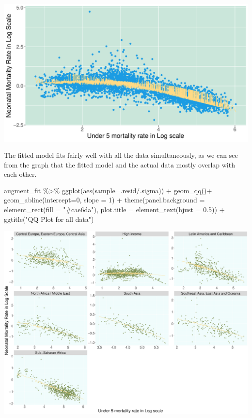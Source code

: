 \documentclass[
]{article}
\newenvironment{Shaded}{\begin{snugshade}}{\end{snugshade}}
\newcommand{\AttributeTok}[1]{\textcolor[rgb]{0.77,0.63,0.00}{#1}}
\newcommand{\DecValTok}[1]{\textcolor[rgb]{0.00,0.00,0.81}{#1}}
\newcommand{\FloatTok}[1]{\textcolor[rgb]{0.00,0.00,0.81}{#1}}
\newcommand{\FunctionTok}[1]{\textcolor[rgb]{0.00,0.00,0.00}{#1}}
\newcommand{\NormalTok}[1]{#1}
\newcommand{\SpecialCharTok}[1]{\textcolor[rgb]{0.00,0.00,0.00}{#1}}
\newcommand{\StringTok}[1]{\textcolor[rgb]{0.31,0.60,0.02}{#1}}
\begin{document}
\includegraphics{A2_files/figure-latex/unnamed-chunk-4-1.pdf}

The fitted model fits fairly well with all the data simultaneously, as
we can see from the graph that the fitted model and the actual data
mostly overlap with each other.

\begin{Shaded}
\begin{Highlighting}[]
\NormalTok{augment\_fit }\SpecialCharTok{\%\textgreater{}\%} 
  \FunctionTok{ggplot}\NormalTok{(}\FunctionTok{aes}\NormalTok{(}\AttributeTok{sample=}\NormalTok{.resid}\SpecialCharTok{/}\NormalTok{.sigma)) }\SpecialCharTok{+}
  \FunctionTok{geom\_qq}\NormalTok{()}\SpecialCharTok{+}
  \FunctionTok{geom\_abline}\NormalTok{(}\AttributeTok{intercept=}\DecValTok{0}\NormalTok{, }\AttributeTok{slope =} \DecValTok{1}\NormalTok{) }\SpecialCharTok{+}
  \FunctionTok{theme}\NormalTok{(}\AttributeTok{panel.background =} \FunctionTok{element\_rect}\NormalTok{(}\AttributeTok{fill =} \StringTok{"\#cae6da"}\NormalTok{),}
        \AttributeTok{plot.title =} \FunctionTok{element\_text}\NormalTok{(}\AttributeTok{hjust =} \FloatTok{0.5}\NormalTok{)) }\SpecialCharTok{+}
  \FunctionTok{ggtitle}\NormalTok{(}\StringTok{"QQ Plot for all data"}\NormalTok{)}
\end{Highlighting}
\end{Shaded}

\includegraphics{A2_files/figure-latex/unnamed-chunk-5-1.pdf}
\end{document}
